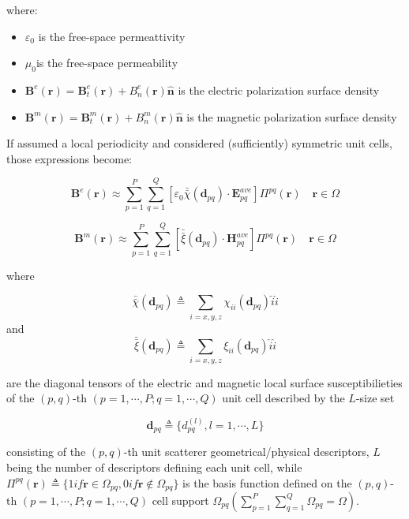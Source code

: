 where:

\begin{itemize}
\item $\varepsilon_{0}$ is the free-space permeattivity
\item $\mu_{0}$is the free-space permeability
\item $\mathbf{B}^{e}(\mathbf{r})=\mathbf{B}_{t}^{e}(\mathbf{r})+B_{n}^{e}(\mathbf{r})\mathbf{\hat{n}}$
is the electric polarization surface density
\item $\mathbf{B}^{m}(\mathbf{r})=\mathbf{B}_{t}^{m}(\mathbf{r})+B_{n}^{m}(\mathbf{r})\mathbf{\hat{n}}$
is the magnetic polarization surface density
\end{itemize}
If assumed a local periodicity and considered (sufficiently) symmetric
unit cells, those expressions become:

\begin{equation}
\mathbf{B}^{e}(\mathbf{r})\approx\sum_{p=1}^{P}\sum_{q=1}^{Q}[\varepsilon_{0}\bar{\bar{\chi}}(\mathbf{d}_{pq})\cdot\mathbf{E}_{pq}^{ave}]\Pi^{pq}(\mathbf{r})\quad\mathbf{r}\in\Omega\label{eq:7}\end{equation}


\begin{equation}
\mathbf{B}^{m}(\mathbf{r})\approx\sum_{p=1}^{P}\sum_{q=1}^{Q}[\bar{\bar{\xi}}(\mathbf{d}_{pq})\cdot\mathbf{H}_{pq}^{ave}]\Pi^{pq}(\mathbf{r})\quad\mathbf{r}\in\Omega\label{eq:8}\end{equation}


where

\begin{equation}
\bar{\bar{\chi}}(\mathbf{d}_{pq})\triangleq\sum_{i=x,y,z}\chi_{ii}(\mathbf{d}_{pq})\hat{i}\hat{i}\label{eq:9}\end{equation}
 and \begin{equation}
\bar{\bar{\xi}}(\mathbf{d}_{pq})\triangleq\sum_{i=x,y,z}\xi_{ii}(\mathbf{d}_{pq})\hat{i}\hat{i}\label{eq:10}\end{equation}


are the diagonal tensors of the electric and magnetic local surface
susceptibilieties of the $(p,q)$-th $(p=1,\cdots,P;q=1,\cdots,Q)$
unit cell described by the $L$-size set

\begin{equation}
\mathbf{d}_{pq}\triangleq\{ d_{pq}^{(l)},l=1,\cdots,L\}\label{eq:11}\end{equation}


consisting of the $(p,q)$-th unit scatterer geometrical/physical
descriptors, \textbf{$L$} being the number of descriptors defining
each unit cell, while $\Pi^{pq}(\mathbf{r})\triangleq\{1if\mathbf{r}\in\Omega_{pq},0if\mathbf{r}\notin\Omega_{pq}\}$
is the basis function defined on the $(p,q)$-th $(p=1,\cdots,P;q=1,\cdots,Q)$
cell support $\Omega_{pq}(\sum_{p=1}^{P}\sum_{q=1}^{Q}\Omega_{pq}=\Omega)$.

